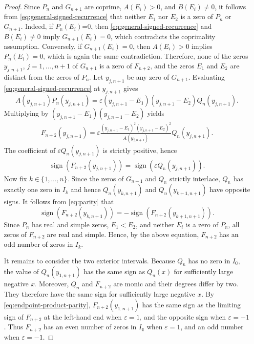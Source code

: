 \documentclass[final,3p,times,12pt]{elsarticle}
\numberwithin{equation}{section}  %
\begin{document}
\begin{proof} Since $P_n$ and $G_{n+1}$ are coprime, $A(E_i)>0$, and $B(E_i)\neq0$, it follows from \eqref{eq:general-signed-recurrence} that neither $E_1$ nor $E_2$ is a zero of $P_n$ or $G_{n+1}$. Indeed, if $P_n(E_i)$=0, then \eqref{eq:general-signed-recurrence} and $B(E_i)\neq 0$ imply $G_{n+1}(E_i)=0$, which contradicts the coprimality assumption. Conversely, if $G_{n+1}(E_i)=0$, then $A(E_i)>0$ implies $P_{n}(E_i)=0$, which is again the same contradiction. Therefore, none of the zeros $y_{j,n+1}$, $j=1,\dots,n+1$ of $G_{n+1}$ is a zero of $F_{n+2}$, and the zeros $E_1$ and $E_2$ are distinct from the zeros of $P_n$. Let $y_{j,n+1}$ be any zero of $G_{n+1}$. Evaluating \eqref{eq:general-signed-recurrence} at $y_{j,n+1}$ gives
\[ A(y_{j,n+1})  P_n(y_{j,n+1}) = \varepsilon(y_{j,n+1}-E_1)(y_{j,n+1}-E_2)Q_n(y_{j,n+1}).\] Multiplying by $(y_{j,n+1}-E_1)(y_{j,n+1}-E_2)$ yields \begin{align} \label{eq:endpoint-product-parity}F_{n+2}(y_{j,n+1})=\varepsilon \frac{(y_{j,n+1}-E_1)^2(y_{j,n+1}-E_2)^2}{A(y_{j,n+1})}Q_n(y_{j,n+1}).\end{align} The coefficient of $\varepsilon Q_n(y_{j,n+1})$ is strictly positive, hence \begin{align}\label{eq:parity}\operatorname{sign}\!\left(F_{n+2}(y_{j,n+1})\right)=\operatorname{sign}\!\left(\varepsilon Q_n(y_{j,n+1})\right).\end{align} Now fix $k\in\{1,\ldots,n\}$. Since the zeros of $G_{n+1}$ and $Q_n$ strictly interlace, $Q_n$ has exactly one zero in $I_k$ and hence $Q_n(y_{k,n+1})$ and $Q_n(y_{k+1,n+1})$ have opposite signs. It follows from \eqref{eq:parity} that \[\operatorname{sign}\!\left(F_{n+2}(y_{k,n+1})\right)=-\operatorname{sign}\!\left(F_{n+2}(y_{k+1,n+1})\right).\] Since $P_n$ has real and simple zeros, $E_1<E_2$, and neither $E_i$ is a zero of $P_n$, all zeros of $F_{n+2}$ are real and simple. Hence, by the above equation, $F_{n+2}$ has an odd number of zeros in $I_k$.

\medskip \noindent It remains to consider the two exterior intervals. Because $Q_n$ has no zero in $I_0$, the value of $Q_n(y_{1,n+1})$ has the same sign as $Q_n(x)$ for sufficiently large negative $x$. Moreover, $Q_n$ and $F_{n+2}$ are monic and their degrees differ by two. They therefore have the same sign for sufficiently large negative $x$. By \eqref{eq:endpoint-product-parity}, $F_{n+2}(y_{1,n+1})$ has the same sign as the limiting sign of $F_{n+2}$ at the left-hand end when $\varepsilon =1$, and the opposite sign when $\varepsilon = - 1$. Thus $F_{n+2}$ has an even number of zeros in $I_0$ when $\varepsilon =1$, and an odd number when $\varepsilon = -1$.


\end{proof}
\end{document}
